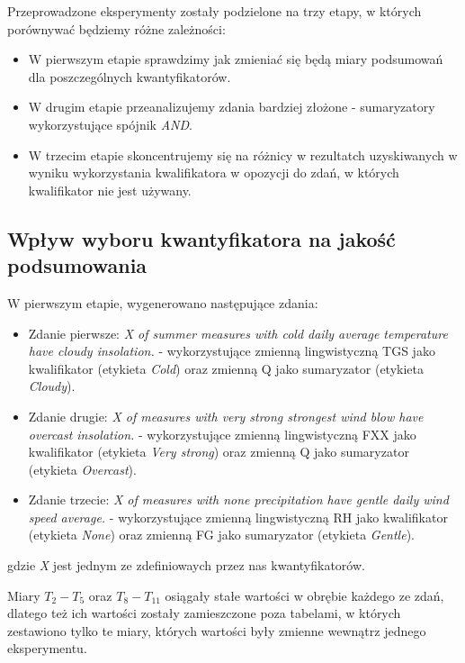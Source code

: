 \documentclass{classrep}
\begin{document}
Przeprowadzone eksperymenty zostały podzielone na trzy etapy, w których porównywać będziemy różne zależności:
\begin{itemize}[label=$\bullet$\scshape\bfseries]
\item W pierwszym etapie sprawdzimy jak zmieniać się będą miary podsumowań dla poszczególnych kwantyfikatorów.
\item W drugim etapie przeanalizujemy zdania bardziej złożone - sumaryzatory wykorzystujące spójnik \emph{AND}.
\item W trzecim etapie skoncentrujemy się na różnicy w rezultatch uzyskiwanych w wyniku wykorzystania kwalifikatora w opozycji do zdań, w których kwalifikator nie jest używany.
\end{itemize}


\subsection{Wpływ wyboru kwantyfikatora na jakość podsumowania}

W pierwszym etapie, wygenerowano następujące zdania:
\begin{itemize}[label=$\bullet$\scshape\bfseries]
\item Zdanie pierwsze: \textit{X of summer measures with cold daily average temperature have cloudy insolation.} - wykorzystujące zmienną lingwistyczną TGS jako kwalifikator (etykieta \textit{Cold}) oraz zmienną Q jako sumaryzator (etykieta \textit{Cloudy}).
\item Zdanie drugie: \textit{X of measures with very strong strongest wind blow have overcast insolation.} - wykorzystujące zmienną lingwistyczną FXX jako kwalifikator (etykieta \textit{Very strong}) oraz zmienną Q jako sumaryzator (etykieta \textit{Overcast}).
\item Zdanie trzecie: \textit{X of measures with none precipitation have gentle daily wind speed average.} - wykorzystujące zmienną lingwistyczną RH jako kwalifikator (etykieta \textit{None}) oraz zmienną FG jako sumaryzator (etykieta \textit{Gentle}).
\end{itemize}
gdzie \textit{X} jest jednym ze zdefiniowaych przez nas kwantyfikatorów.\newline

Miary $T_2 - T_5$ oraz $T_8 - T_{11}$ osiągały stałe wartości w obrębie każdego ze zdań, dlatego też ich wartości zostały zamieszczone poza tabelami, w których zestawiono tylko te miary, których wartości były zmienne wewnątrz jednego eksperymentu.
\end{document}
